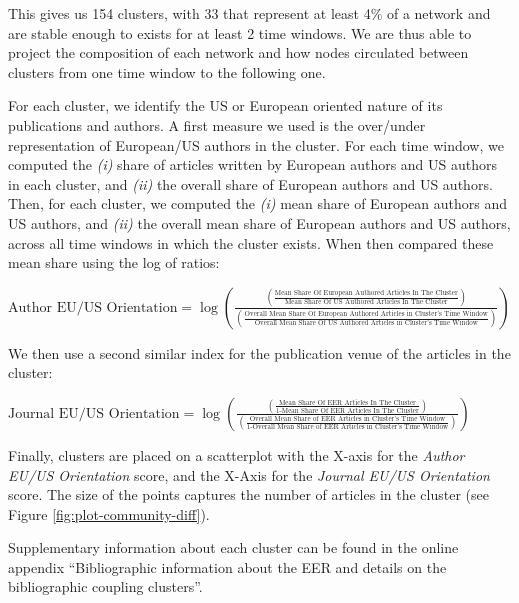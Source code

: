 \documentclass[
  12pt,
  onecolumn]{article}
\begin{document}
This gives us 154 clusters, with 33 that represent at least 4\% of a network and are stable enough to exists for at least 2 time windows. We are thus able to project the composition of each network and how nodes circulated between clusters from one time window to the following one.

For each cluster, we identify the US or European oriented nature of its publications and authors. A first measure we used is the over/under representation of European/US authors in the cluster. For each time window, we computed the \emph{(i)} share of articles written by European authors and US authors in each cluster, and \emph{(ii)} the overall share of European authors and US authors. Then, for each cluster, we computed the \emph{(i)} mean share of European authors and US authors, and \emph{(ii)} the overall mean share of European authors and US authors, across all time windows in which the cluster exists. When then compared these mean share using the log of ratios:

\bigskip

\({\scriptstyle \text{Author EU/US Orientation}=\log(\frac{(\frac{\text{Mean Share Of European Authored Articles In The Cluster}}{\text{Mean Share Of US Authored Articles In The Cluster}})} {(\frac{\text{Overall Mean Share Of European Authored Articles in Cluster's Time Window}}{\text{Overall Mean Share Of US Authored Articles in Cluster's Time Window}})})}\)
\bigskip

We then use a second similar index for the publication venue of the articles in the cluster:

\bigskip

\({\scriptstyle \text{Journal EU/US Orientation}=\log(\frac{(\frac{\text{Mean Share Of EER Articles In The Cluster}}{\text{1-Mean Share Of EER Articles In The Cluster}})} {(\frac{\text{Overall Mean Share of EER Articles in Cluster's Time Window}}{\text{1-Overall Mean Share of EER Articles in Cluster's Time Window}})})}\)
\bigskip

Finally, clusters are placed on a scatterplot with the X-axis for the \emph{Author EU/US Orientation} score, and the X-Axis for the \emph{Journal EU/US Orientation} score. The size of the points captures the number of articles in the cluster (see Figure \ref{fig:plot-community-diff}).

Supplementary information about each cluster can be found in the online appendix ``Bibliographic information about the EER and details on the bibliographic coupling clusters''.
\end{document}
